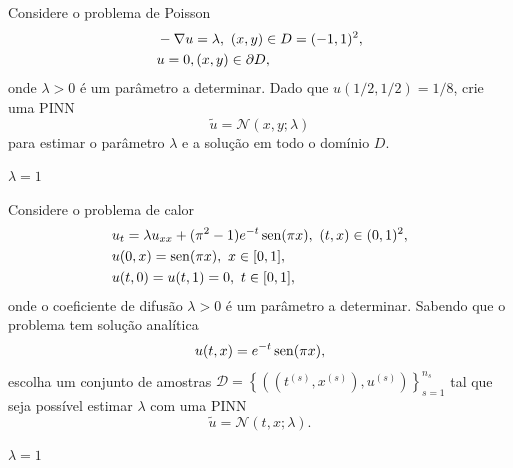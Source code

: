 \begin{ex}
  Considere o problema de Poisson{\poisson}
  \begin{subequations}
    \begin{align}
      &-\nabla u = \lambda, ~(x,y)\in D=(-1,1)^2,\\
      &u = 0, (x,y)\in\partial D,        
    \end{align}
  \end{subequations}
  onde $\lambda > 0$ é um parâmetro a determinar. Dado que $u(1/2,1/2) = 1/8$, crie uma PINN 
  \begin{equation}
    \tilde{u} = \mathcal{N}(x,y;\lambda)
  \end{equation}
  para estimar o parâmetro $\lambda$ e a solução em todo o domínio $D$.
\end{ex}
\begin{resp}
  $\lambda = 1$
\end{resp}

\begin{ex}
  Considere o problema de calor
  \begin{subequations}
    \begin{align}
      &u_t = \lambda u_{xx} + (\pi^2-1)e^{-t}\operatorname{sen}(\pi x), ~(t,x)\in(0,1)^2,\\
      &u(0,x) = \operatorname{sen}(\pi x), ~x\in[0,1],\\
      &u(t,0) = u(t,1) = 0, ~t\in[0,1],
    \end{align}
  \end{subequations}
  onde o coeficiente de difusão $\lambda>0$ é um parâmetro a determinar. Sabendo que o problema tem solução analítica
  \begin{equation}
    u(t,x) = e^{-t}\operatorname{sen}(\pi x),
  \end{equation}
  escolha um conjunto de amostras $\mathcal{D} = \left\{\left(\left(t^{(s)},x^{(s)}\right),u^{(s)}\right)\right\}_{s=1}^{n_s}$ tal que seja possível estimar $\lambda$ com uma PINN
  \begin{equation}
    \tilde{u} = \mathcal{N}(t,x;\lambda).
  \end{equation}
\end{ex}
\begin{resp}
  $\lambda = 1$
\end{resp}


